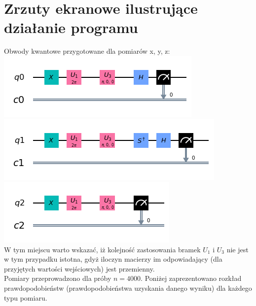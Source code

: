 \documentclass{article}
\begin{document}
\section{Zrzuty ekranowe ilustrujące działanie programu}
Obwody kwantowe przygotowane dla pomiarów x, y, z:\\
\includegraphics[]{pomiarx.png}\\
\includegraphics[]{pomiary.png}\\
\includegraphics[]{pomiarz.png}\\
W tym miejscu warto wskazać, iż kolejność zastosowania bramek $U_1$ i $U_3$ nie jest w tym przypadku istotna, gdyż iloczyn macierzy im odpowiadający (dla przyjętych wartości wejściowych) jest przemienny.\\
Pomiary przeprowadzono dla próby $n=4000$. Poniżej zaprezentowano rozkład prawdopodobieństw (prawdopodobieństwa uzyskania danego wyniku) dla każdego typu pomiaru.
\begin{center}
\end{center}
\end{document}
